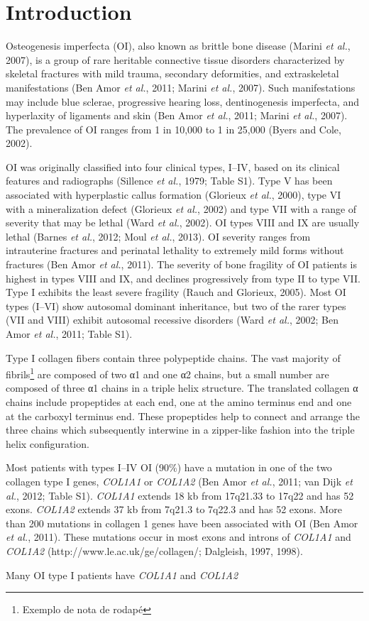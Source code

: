 \section*{Introduction}\par Osteogenesis imperfecta (OI), also known as brittle bone disease (Marini \textit{et al.}, 2007), is a group of rare heritable connective tissue disorders characterized by skeletal fractures with mild trauma, secondary deformities, and extraskeletal manifestations (Ben Amor \textit{et al.}, 2011; Marini \textit{et al.}, 2007). Such manifestations may include blue sclerae, progressive hearing loss, dentinogenesis imperfecta, and hyperlaxity of ligaments and skin (Ben Amor \textit{et al.}, 2011; Marini \textit{et al.}, 2007). The prevalence of OI ranges from 1 in 10,000 to 1 in 25,000 (Byers and Cole, 2002).\par OI was originally classified into four clinical types, I–IV, based on its clinical features and radiographs (Sillence \textit{et al.}, 1979; Table S1). Type V has been associated with hyperplastic callus formation (Glorieux \textit{et al.}, 2000), type VI with a mineralization defect (Glorieux \textit{et al.}, 2002) and type VII with a range of severity that may be lethal (Ward \textit{et al.}, 2002). OI types VIII and IX are usually lethal (Barnes \textit{et al.}, 2012; Moul \textit{et al.}, 2013). OI severity ranges from intrauterine fractures and perinatal lethality to extremely mild forms without fractures (Ben Amor \textit{et al.}, 2011). The severity of bone fragility of OI patients is highest in types VIII and IX, and declines progressively from type II to type VII. Type I exhibits the least severe fragility (Rauch and Glorieux, 2005). Most OI types (I–VI) show autosomal dominant inheritance, but two of the rarer types (VII and VIII) exhibit autosomal recessive disorders (Ward \textit{et al.}, 2002; Ben Amor \textit{et al.}, 2011; Table S1).\par Type I collagen fibers contain three polypeptide chains. The vast majority of fibrils\protect\footnote{Exemplo de nota de rodapé} are composed of two α1 and one α2 chains, but a small number are composed of three α1 chains in a triple helix structure. The translated collagen α chains include propeptides at each end, one at the amino terminus end and one at the carboxyl terminus end. These propeptides help to connect and arrange the three chains which subsequently interwine in a zipper-like fashion into the triple helix configuration.\par Most patients with types I–IV OI (90\%) have a mutation in one of the two collagen type I genes, \textit{COL1A1} or \textit{COL1A2} (Ben Amor \textit{et al.}, 2011; van Dijk \textit{et al.}, 2012; Table S1). \textit{COL1A1} extends 18 kb from 17q21.33 to 17q22 and has 52 exons. \textit{COL1A2} extends 37 kb from 7q21.3 to 7q22.3 and has 52 exons. More than 200 mutations in collagen 1 genes have been associated with OI (Ben Amor \textit{et al.}, 2011). These mutations occur in most exons and introns of \textit{COL1A1} and \textit{COL1A2} (http://www.le.ac.uk/ge/collagen/; Dalgleish, 1997, 1998).\par Many OI type I patients have \textit{COL1A1} and \textit{COL1A2} 